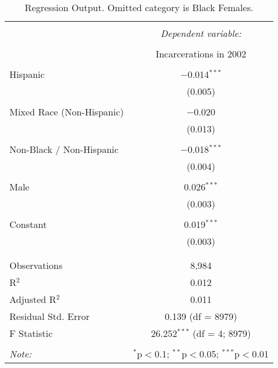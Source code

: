 
\begin{table}[!htbp] \centering 
  \caption{Regression Output. Omitted category is Black Females.} 
  \label{tab:regression} 
\begin{tabular}{@{\extracolsep{5pt}}lc} 
\\[-1.8ex]\hline 
\hline \\[-1.8ex] 
 & \multicolumn{1}{c}{\textit{Dependent variable:}} \\ 
\cline{2-2} 
\\[-1.8ex] & Incarcerations in 2002 \\ 
\hline \\[-1.8ex] 
 Hispanic & $-$0.014$^{***}$ \\ 
  & (0.005) \\ 
  & \\ 
 Mixed Race (Non-Hispanic) & $-$0.020 \\ 
  & (0.013) \\ 
  & \\ 
 Non-Black / Non-Hispanic & $-$0.018$^{***}$ \\ 
  & (0.004) \\ 
  & \\ 
 Male & 0.026$^{***}$ \\ 
  & (0.003) \\ 
  & \\ 
 Constant & 0.019$^{***}$ \\ 
  & (0.003) \\ 
  & \\ 
\hline \\[-1.8ex] 
Observations & 8,984 \\ 
R$^{2}$ & 0.012 \\ 
Adjusted R$^{2}$ & 0.011 \\ 
Residual Std. Error & 0.139 (df = 8979) \\ 
F Statistic & 26.252$^{***}$ (df = 4; 8979) \\ 
\hline 
\hline \\[-1.8ex] 
\textit{Note:}  & \multicolumn{1}{r}{$^{*}$p$<$0.1; $^{**}$p$<$0.05; $^{***}$p$<$0.01} \\ 
\end{tabular} 
\end{table} 
